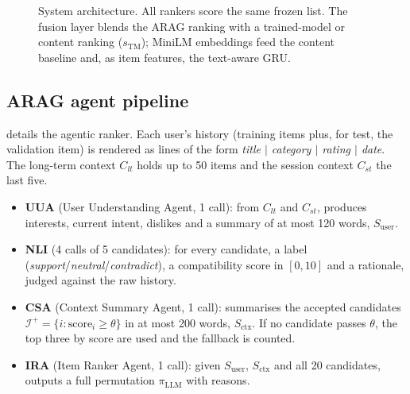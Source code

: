 \documentclass[11pt,a4paper]{article}
\newcommand{\Hit}{\mathrm{Hit}}
\newcommand{\MRR}{\mathrm{MRR}}
\begin{document}
\begin{figure}[htbp]
\caption{System architecture. All rankers score the same frozen list. The fusion layer blends
the ARAG ranking with a trained-model or content ranking ($s_{\mathrm{TM}}$); MiniLM embeddings
feed the content baseline and, as item features, the text-aware GRU.}
\label{fig:arch}
\end{figure}

\subsection{ARAG agent pipeline}
\label{sec:arag}

 details the agentic ranker. Each user's history (training items plus, for test,
the validation item) is rendered as lines of the form \textit{title $\mid$ category $\mid$
rating $\mid$ date}. The long-term context $C_{lt}$ holds up to 50 items and the session context
$C_{st}$ the last five.

\begin{itemize}
  \item \textbf{UUA} (User Understanding Agent, 1 call): from $C_{lt}$ and $C_{st}$, produces
  interests, current intent, dislikes and a summary of at most 120 words, $S_{\mathrm{user}}$.
  \item \textbf{NLI} (4 calls of 5 candidates): for every candidate, a label
  (\textit{support}/\textit{neutral}/\textit{contradict}), a compatibility score in $[0,10]$ and a
  rationale, judged against the raw history.
  \item \textbf{CSA} (Context Summary Agent, 1 call): summarises the accepted candidates
  $\mathcal{I}^+=\{i : \mathrm{score}_i \ge \theta\}$ in at most 200 words, $S_{\mathrm{ctx}}$.
  If no candidate passes $\theta$, the top three by score are used and the fallback is counted.
  \item \textbf{IRA} (Item Ranker Agent, 1 call): given $S_{\mathrm{user}}$, $S_{\mathrm{ctx}}$
  and all 20 candidates, outputs a full permutation $\pi_{\mathrm{LLM}}$ with reasons.
\end{itemize}
\end{document}
